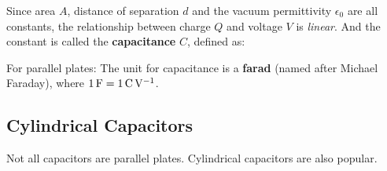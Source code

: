 %

Since area $A$, distance of separation $d$ and the vacuum permittivity
$\epsilon_0$ are all constants, the relationship between charge $Q$ and voltage
$V$ is \emph{linear}. And the constant is called the \textbf{capacitance} $C$,
defined as:

%
For parallel plates:
%
%
The unit for capacitance is a \textbf{farad} (named after Michael Faraday),
where $\SI1\farad=\SI1{\coulomb\per\volt}$.




\subsection{Cylindrical Capacitors}

Not all capacitors are parallel plates. Cylindrical capacitors are also popular.






